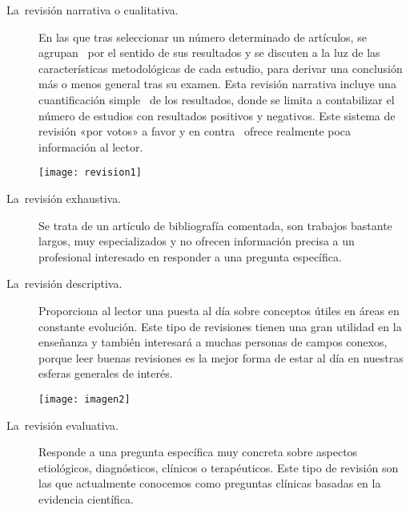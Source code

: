 \begin{description}
	\item[La revisión narrativa o cualitativa.]  En las que tras seleccionar un número determinado de artículos, se agrupan  por el sentido de sus resultados y se discuten a la luz de las características metodológicas de cada estudio, para derivar una conclusión más o menos general tras su examen. Esta revisión narrativa incluye una cuantificación simple  de los resultados, donde se limita a contabilizar el número de estudios con resultados positivos y negativos. Este sistema de revisión «por votos» a favor y en contra  ofrece realmente poca información al lector. 
	
	\begin{marginfigure}[-3cm]%
		\texttt{[image: revision1]}
	\end{marginfigure}
	
	
	\item[La revisión exhaustiva.]  Se trata de un artículo de bibliografía comentada, son trabajos bastante largos, muy especializados y no ofrecen información precisa a un profesional interesado en responder a una pregunta específica. 
	
	\item[La revisión descriptiva.] Proporciona al lector una puesta al día sobre conceptos útiles en áreas en constante evolución. Este tipo de revisiones tienen una gran utilidad en la enseñanza y también interesará a muchas personas de campos conexos, porque leer buenas revisiones es la mejor forma de estar al día en nuestras esferas generales de interés. 
	
	\begin{marginfigure}[-2cm]%
		\texttt{[image: imagen2]}
	\end{marginfigure}
	
	\item[La revisión evaluativa.] Responde a una pregunta específica muy concreta sobre aspectos etiológicos, diagnósticos, clínicos o terapéuticos. Este tipo de revisión son las que actualmente conocemos como preguntas clínicas basadas en la evidencia científica. 
	
 
\end{description}
	
	


 


 





